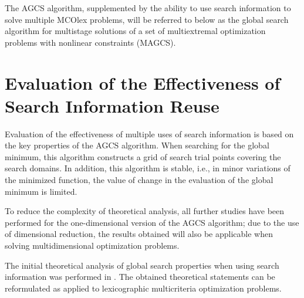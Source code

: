 \documentclass[smallextended]{svjour3}       %
\begin{document}
The AGCS algorithm, supplemented by the ability to use search information to solve multiple MCOlex problems, will be referred to below as the global search algorithm for multistage solutions of a set of multiextremal optimization problems with nonlinear constraints (MAGCS).

\section{Evaluation of the Effectiveness of Search Information Reuse}
\label{sec:4}

Evaluation of the effectiveness of multiple uses of search information is based on the key properties of the AGCS algorithm. When searching for the global minimum, this algorithm constructs a grid of search trial points covering the search domains. In addition, this algorithm is stable, i.e., in minor variations of the minimized function, the value of change in the evaluation of the global minimum is limited.

To reduce the complexity of theoretical analysis, all further studies have been performed for the one-dimensional version of the AGCS algorithm; due to the use of dimensional reduction, the results obtained will also be applicable when solving multidimensional optimization problems.

The initial theoretical analysis of global search properties when using search information was performed in \cite{c48}. The obtained theoretical statements can be reformulated as applied to lexicographic multicriteria optimization problems. 
\end{document}

